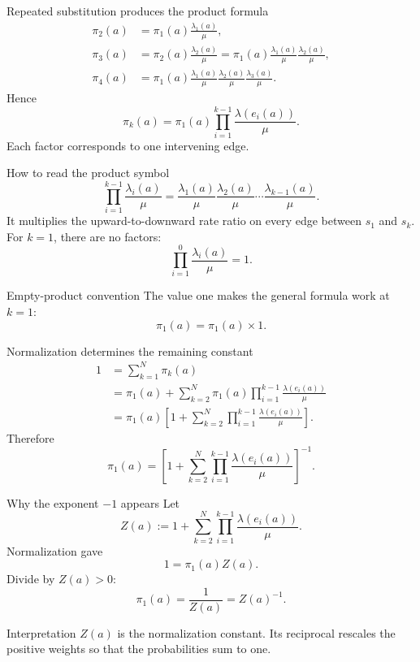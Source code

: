 \documentclass[aspectratio=169,10pt]{beamer}
\begin{document}
\begin{frame}{Repeated substitution produces the product formula}
\begin{align*}
\pi_2(a)
&=\pi_1(a)\frac{\lambda_1(a)}{\mu},\\
\pi_3(a)
&=\pi_2(a)\frac{\lambda_2(a)}{\mu}
=\pi_1(a)\frac{\lambda_1(a)}{\mu}
\frac{\lambda_2(a)}{\mu},\\
\pi_4(a)
&=\pi_1(a)\frac{\lambda_1(a)}{\mu}
\frac{\lambda_2(a)}{\mu}
\frac{\lambda_3(a)}{\mu}.
\end{align*}
Hence
\[
\boxed{
\pi_k(a)=\pi_1(a)
\prod_{i=1}^{k-1}
\frac{\lambda(e_i(a))}{\mu}.}
\]
Each factor corresponds to one intervening edge.
\end{frame}

\begin{frame}{How to read the product symbol}
\[
\prod_{i=1}^{k-1}\frac{\lambda_i(a)}{\mu}
=
\frac{\lambda_1(a)}{\mu}
\frac{\lambda_2(a)}{\mu}
\cdots
\frac{\lambda_{k-1}(a)}{\mu}.
\]
It multiplies the upward-to-downward rate ratio on every edge between $s_1$ and $s_k$.
\vspace{3mm}
For $k=1$, there are no factors:
\[
\prod_{i=1}^{0}\frac{\lambda_i(a)}{\mu}=1.
\]
\begin{exampleblock}{Empty-product convention}
The value one makes the general formula work at $k=1$:
\[
\pi_1(a)=\pi_1(a)\times1.
\]
\end{exampleblock}
\end{frame}

\begin{frame}{Normalization determines the remaining constant}
\begin{align*}
1
&=\sum_{k=1}^N\pi_k(a)\\
&=\pi_1(a)+
\sum_{k=2}^N
\pi_1(a)\prod_{i=1}^{k-1}
\frac{\lambda(e_i(a))}{\mu}\\
&=\pi_1(a)\left[
1+\sum_{k=2}^N
\prod_{i=1}^{k-1}
\frac{\lambda(e_i(a))}{\mu}
\right].
\end{align*}
Therefore
\[
\boxed{
\pi_1(a)=
\left[
1+\sum_{k=2}^N
\prod_{i=1}^{k-1}
\frac{\lambda(e_i(a))}{\mu}
\right]^{-1}.}
\]
\end{frame}

\begin{frame}{Why the exponent \texorpdfstring{$-1$}{-1} appears}
Let
\[
Z(a):=
1+\sum_{k=2}^N
\prod_{i=1}^{k-1}\frac{\lambda(e_i(a))}{\mu}.
\]
Normalization gave
\[
1=\pi_1(a)Z(a).
\]
Divide by $Z(a)>0$:
\[
\pi_1(a)=\frac{1}{Z(a)}=Z(a)^{-1}.
\]
\begin{block}{Interpretation}
$Z(a)$ is the normalization constant. Its reciprocal rescales the positive weights so that the probabilities sum to one.
\end{block}
\end{frame}
\end{document}
